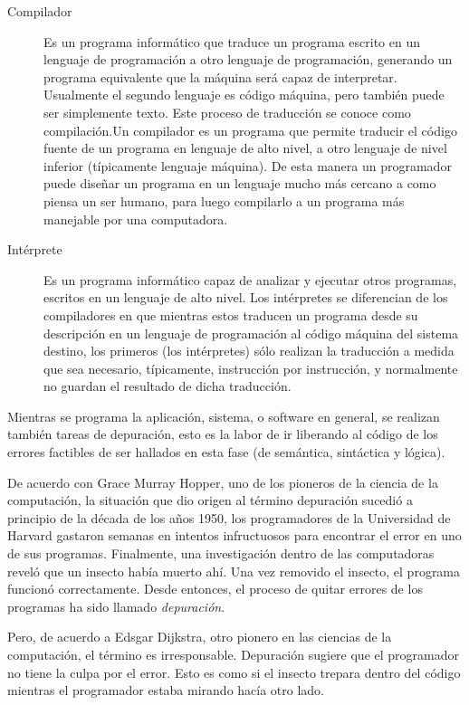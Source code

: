 \documentclass[12pt,legalpaper]{report}
\begin{document}
\begin{description}
	\item[Compilador] Es un programa informático que traduce un programa escrito en un lenguaje de programación a otro lenguaje de programación, generando un programa equivalente que la máquina será capaz de interpretar. Usualmente el segundo lenguaje es código máquina, pero también puede ser simplemente texto. Este proceso de traducción se conoce como compilación.Un compilador es un programa que permite traducir el código fuente de un programa en lenguaje de alto nivel, a otro lenguaje de nivel inferior (típicamente lenguaje máquina). De esta manera un programador puede diseñar un programa en un lenguaje mucho más cercano a como piensa un ser humano, para luego compilarlo a un programa más manejable por una computadora.

	\item[Intérprete] Es un programa informático capaz de analizar y ejecutar otros programas, escritos en un lenguaje de alto nivel. Los intérpretes se diferencian de los compiladores en que mientras estos traducen un programa desde su descripción en un lenguaje de programación al código máquina del sistema destino, los primeros (los intérpretes) sólo realizan la traducción a medida que sea necesario, típicamente, instrucción por instrucción, y normalmente no guardan el resultado de dicha traducción.
	
\end{description}

Mientras se programa la aplicación, sistema, o software en general, se realizan también tareas de depuración, esto es la labor de ir liberando al código de los errores factibles de ser hallados en esta fase (de semántica, sintáctica y lógica). 

De acuerdo con Grace Murray Hopper, uno de los pioneros de la ciencia de la computación, la situación que dio origen al término depuración sucedió a principio de la década de los años 1950, los programadores de la Universidad de Harvard gastaron semanas en intentos infructuosos para encontrar el error en uno de sus programas. Finalmente, una investigación dentro de las computadoras reveló que un insecto había muerto ahí. Una vez removido el insecto, el programa funcionó correctamente. Desde entonces, el proceso de quitar errores de los programas ha sido llamado \textit{depuración}.

Pero, de acuerdo a Edsgar Dijkstra, otro pionero en las ciencias de la computación, el término es irresponsable. Depuración sugiere que el programador no tiene la culpa por el error. Esto es como si el insecto trepara dentro del código mientras el programador estaba mirando hacía otro lado.
\end{document}
